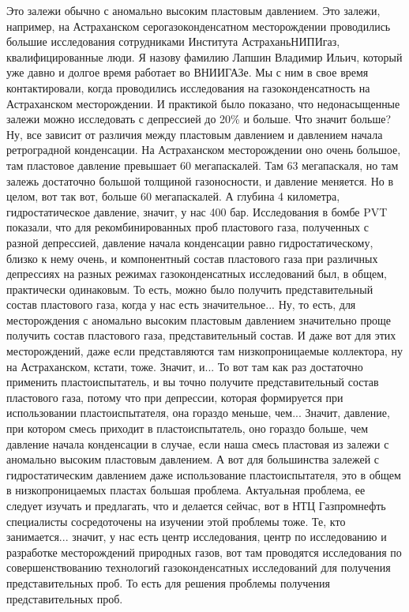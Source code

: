 \documentclass[main.tex]{subfiles}
\begin{document}
Это залежи обычно с аномально высоким пластовым давлением.
Это залежи, например, на Астраханском серогазоконденсатном месторождении проводились большие исследования сотрудниками Института АстраханьНИПИгаз, квалифицированные люди.
Я назову фамилию Лапшин Владимир Ильич, который уже давно и долгое время работает во ВНИИГАЗе.
Мы с ним в свое время контактировали, когда проводились исследования на газоконденсатность на Астраханском месторождении.
И практикой было показано, что недонасыщенные залежи можно исследовать с депрессией до 20\% и больше.
Что значит больше?
Ну, все зависит от различия между пластовым давлением и давлением начала ретроградной конденсации.
На Астраханском месторождении оно очень большое, там пластовое давление превышает 60 мегапаскалей.
Там 63 мегапаскаля, но там залежь достаточно большой толщиной газоносности, и давление меняется.
Но в целом, вот так вот, больше 60 мегапаскалей.
А глубина 4 километра, гидростатическое давление, значит, у нас 400 бар.
Исследования в бомбе PVT показали, что для рекомбинированных проб пластового газа, полученных с разной депрессией, давление начала конденсации равно гидростатическому, близко к нему очень, и компонентный состав пластового газа при различных депрессиях на разных режимах газоконденсатных исследований был, в общем, практически одинаковым.
То есть, можно было получить представительный состав пластового газа, когда у нас есть значительное...
Ну, то есть, для месторождения с аномально высоким пластовым давлением значительно проще получить состав пластового газа, представительный состав.
И даже вот для этих месторождений, даже если представляются там низкопроницаемые коллектора, ну на Астраханском, кстати, тоже.
Значит, и...
То вот там как раз достаточно применить пластоиспытатель, и вы точно получите представительный состав пластового газа, потому что при депрессии, которая формируется при использовании пластоиспытателя, она гораздо меньше, чем...
Значит, давление, при котором смесь приходит в пластоиспытатель, оно гораздо больше, чем давление начала конденсации в случае, если наша смесь пластовая из залежи с аномально высоким пластовым давлением.
А вот для большинства залежей с гидростатическим давлением даже использование пластоиспытателя, это в общем в низкопроницаемых пластах большая проблема.
Актуальная проблема, ее следует изучать и предлагать, что и делается сейчас, вот в НТЦ Газпромнефть специалисты сосредоточены на изучении этой проблемы тоже.
Те, кто занимается... значит, у нас есть центр исследования, центр по исследованию и разработке месторождений природных газов, вот там проводятся исследования по совершенствованию технологий газоконденсатных исследований для получения представительных проб.
То есть для решения проблемы получения представительных проб.
\end{document}

